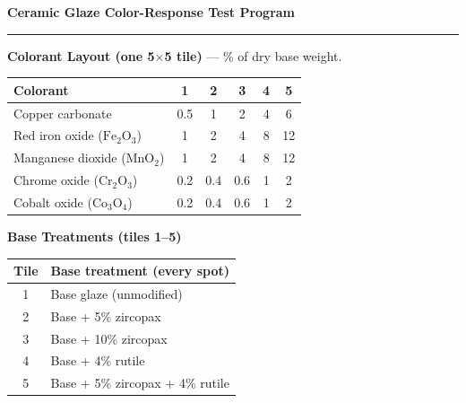 \documentclass[11pt]{article}
\begin{document}
\pagestyle{empty}

\begin{center}
	{\LARGE\bfseries Ceramic Glaze Color-Response Test Program}
\end{center}
\hrule
\vspace{1.5em}

\noindent
\begin{minipage}[t]{0.46\textwidth}
	\textbf{Colorant Layout (one 5$\times$5 tile)} --- \% of dry base weight.

	\vspace{0.6em}
	\begin{tabular}{l c c c c c}
		\hline
		\textbf{Colorant}                    & \textbf{1} & \textbf{2} & \textbf{3} & \textbf{4} & \textbf{5} \\
		\hline
		Copper carbonate                     & 0.5        & 1          & 2          & 4          & 6          \\
		Red iron oxide ($\mathrm{Fe_2O_3}$)  & 1          & 2          & 4          & 8          & 12         \\
		Manganese dioxide ($\mathrm{MnO_2}$) & 1          & 2          & 4          & 8          & 12         \\
		Chrome oxide ($\mathrm{Cr_2O_3}$)    & 0.2        & 0.4        & 0.6        & 1          & 2          \\
		Cobalt oxide ($\mathrm{Co_3O_4}$)    & 0.2        & 0.4        & 0.6        & 1          & 2          \\
		\hline
	\end{tabular}
\end{minipage}
\hfill
\begin{minipage}[t]{0.50\textwidth}
	\textbf{Base Treatments (tiles 1--5)}

	\vspace{0.6em}
	\begin{tabular}{c l}
		\hline
		\textbf{Tile} & \textbf{Base treatment (every spot)} \\
		\hline
		1             & Base glaze (unmodified)              \\
		2             & Base + 5\% zircopax                  \\
		3             & Base + 10\% zircopax                 \\
		4             & Base + 4\% rutile                    \\
		5             & Base + 5\% zircopax + 4\% rutile     \\
		\hline
	\end{tabular}
\end{minipage}
\end{document}
